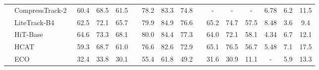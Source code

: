 \begin{table}[h]
{\begin{tabular}{c| l|ccc c ccc c ccc |c cc}
       & CompressTrack-2~\cite{compressTrack} & 60.4                      & 68.5       & 61.5                            &  & 78.2                        & 83.3       & 74.8                    &  & -    & -          & -           & 6.78  & 6.2  & 11.5 \\
       & LiteTrack-B4~\cite{LiteTrack}        & 62.5                      & 72.1       & 65.7                            &  & 79.9                        & 84.9       & 76.6                    &  & 65.2 & 74.7       & 57.5        & 8.48  & 3.6  & 9.4  \\
       & HiT-Base~\cite{HiT}                  & 64.6                      & 73.3       & 68.1                            &  & 80.0                        & 84.4       & 77.3                    &  & 64.0 & 72.1       & 58.1        & 4.34  & 6.7  & 12.1 \\
       & HCAT~\cite{HCAT}                     & 59.3                      & 68.7       & 61.0                            &  & 76.6                        & 82.6       & 72.9                    &  & 65.1 & 76.5       & 56.7        & 5.48  & 7.1    & 17.5    \\
       
       & ECO~\cite{ECO}                       & 32.4                      & 33.8       & 30.1                            &  & 55.4                        & 61.8       & 49.2                    &  & 31.6 & 30.9       & 11.1        & -     & 5.9    & 13.3   \\
      \bottomrule
    \end{tabular}
  }
\end{table}